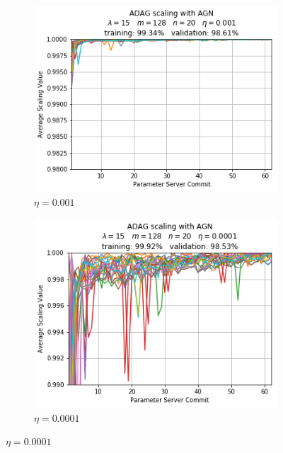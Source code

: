 \begin{figure}[H]
  \centering
  \begin{subfigure}{.3\textwidth}
    \centering
    \includegraphics[width=\linewidth]{resources/images/plots/adag_agn_mnist/epoch_40/15/001/adag_agn_scaling_overview}
    \caption{$\eta = 0.001$}
  \end{subfigure}
  \begin{subfigure}{.3\textwidth}
    \centering
    \includegraphics[width=\linewidth]{resources/images/plots/adag_agn_mnist/epoch_40/15/0001/scaling_detail}
    \caption{$\eta = 0.0001$}
  \end{subfigure}

\end{figure}
